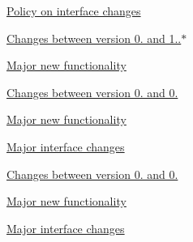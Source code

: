 \begin{DoxyItemize}
\item \hyperlink{index_interface_changes}{Policy on interface changes}
\item \hyperlink{index_zero_point_nine_to_one_point_zero}{Changes between version 0. and 1..$\ast$}
\begin{DoxyItemize}
\item \hyperlink{index_new_functionality_one_point_zero}{Major new functionality}
\end{DoxyItemize}
\item \hyperlink{index_zero_point_eight_five_to_zero_point_nine}{Changes between version 0. and 0.}
\begin{DoxyItemize}
\item \hyperlink{index_new_functionality_zero_point_nine}{Major new functionality}
\item \hyperlink{index_major_interface_changes_zero_point_nine}{Major interface changes}
\end{DoxyItemize}
\item \hyperlink{index_zero_point_eight_to_zero_point_five}{Changes between version 0. and 0.}
\begin{DoxyItemize}
\item \hyperlink{index_new_functionality_zero_point_five}{Major new functionality}
\item \hyperlink{index_major_interface_changes_zero_point_five}{Major interface changes}
\end{DoxyItemize}
\end{DoxyItemize}

 

